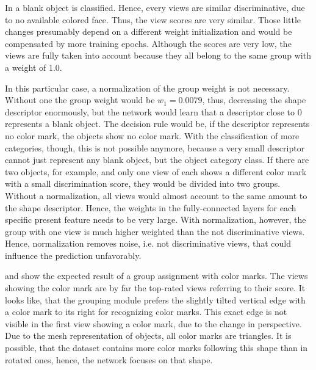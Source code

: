 In  a blank object is classified.
Hence, every views are similar discriminative, due to no available colored face.
Thus, the view scores are very similar.
Those little changes presumably depend on a different weight initialization and would be compensated by more training epochs.
Although the scores are very low, the views are fully taken into account because they all belong to the same group with a weight of 1.0.

In this particular case, a normalization of the group weight is not necessary.
Without one the group weight would be $w_1 = 0.0079$, thus, decreasing the shape descriptor enormously, but the network would learn that a descriptor close to 0 represents a blank object.
The decision rule would be, if the descriptor represents no color mark, the objects show no color mark.
With the classification of more categories, though, this is not possible anymore, because a very small descriptor cannot just represent any blank object, but the object category class.
If there are two objects, for example, and only one view of each shows a different color mark with a small discrimination score, they would be divided into two groups.
Without a normalization, all views would almost account to the same amount to the shape descriptor.
Hence, the weights in the fully-connected layers for each specific present feature needs to be very large.
With normalization, however, the group with one view is much higher weighted than the not discriminative views.
Hence, normalization removes noise, i.e. not discriminative views, that could influence the prediction unfavorably.

 and  show the expected result of a group assignment with color marks.
The views showing the color mark are by far the top-rated views referring to their score.
It looks like, that the grouping module prefers the slightly tilted vertical edge with a color mark to its right for recognizing color marks.
This exact edge is not visible in the first view showing a color mark, due to the change in perspective.
Due to the mesh representation of objects, all color marks are triangles.
It is possible, that the dataset contains more color marks following this shape than in rotated ones, hence, the network focuses on that shape.

